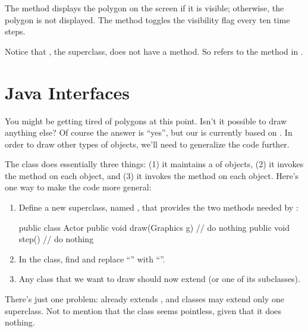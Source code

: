 The  method displays the polygon on the screen if it is visible;
otherwise, the polygon is not displayed.
The  method toggles the visibility flag every ten time steps.

Notice that , the superclass, does not have a  method.
So  refers to the  method in .



\section{Java Interfaces}

You might be getting tired of polygons at this point.
Isn't it possible to draw anything else?
Of course the answer is ``yes'', but our  is currently based on .
In order to draw other types of objects, we'll need to generalize the code further.

The  class does essentially three things: (1) it maintains a  of objects, (2) it invokes the  method on each object, and (3) it invokes the  method on each object.
Here's one way to make the code more general:

\begin{enumerate}

\item
Define a new superclass, named , that provides the two methods needed by :

\begin{code}
public class Actor {
    public void draw(Graphics g) {
        // do nothing
    }
    public void step() {
        // do nothing
    }
}
\end{code}

\item
In the  class, find and replace ``'' with ``''.

\item
Any class that we want to draw should now extend  (or one of its subclasses).

\end{enumerate}

There's just one problem:  already extends , and classes may extend only one superclass.
Not to mention that the  class seems pointless, given that it does nothing.

